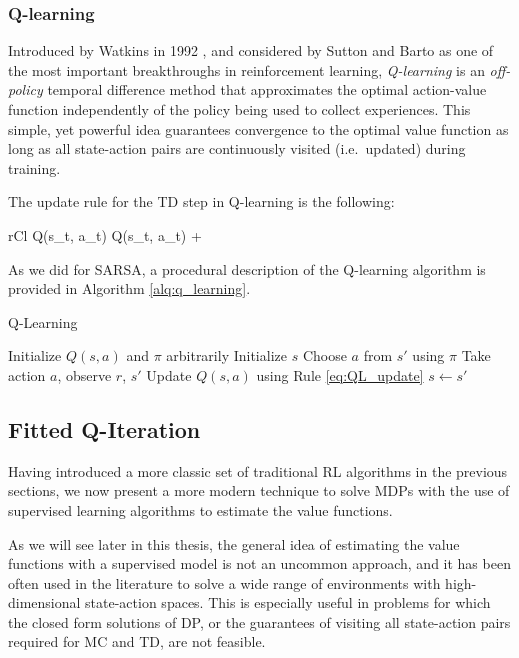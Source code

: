\subsubsection{Q-learning}
Introduced by Watkins in 1992 \cite{watkins1992q}, and considered by Sutton and 
Barto \cite{sutton1998reinforcement} as one of the most important breakthroughs 
in reinforcement learning, \textit{Q-learning} is an \textit{off-policy} 
temporal difference method that approximates the optimal action-value function 
independently of the policy being used to collect experiences. 
This simple, yet powerful idea guarantees convergence to the optimal 
value function as long as all state-action pairs are continuously visited (i.e.\ 
updated) during training.

The update rule for the TD step in Q-learning is the following: 
%
\begin{IEEEeqnarray}{rCl}
    Q(s_t, a_t) \leftarrow Q(s_t, a_t) +  \label{eq:QL_update}
\end{IEEEeqnarray}
%
As we did for SARSA, a procedural description of the Q-learning algorithm is
provided in Algorithm \ref{alq:q_learning}.
%
\begin{algorithm}
    \caption{Q-Learning}
    \label{alq:q_learning}
    \begin{algorithmic}
        \STATE Initialize $Q(s,a)$ and $\pi$ arbitrarily
        \REPEAT
	    \STATE Initialize $s$
	    \REPEAT	
		\STATE Choose $a$ from $s'$ using $\pi$
		\STATE Take action $a$, observe $r$, $s'$
		\STATE Update $Q(s, a)$ using Rule \eqref{eq:QL_update}
		\STATE $s \leftarrow s'$
    \end{algorithmic}
\end{algorithm}
%

\subsection{Fitted Q-Iteration} \label{s:FQI}
Having introduced a more classic set of traditional RL algorithms in the 
previous sections, we now present a more modern technique to solve MDPs with the 
use of supervised learning algorithms to estimate the value functions.

As we will see later in this thesis, the general idea of estimating the value 
functions with a supervised model is not an uncommon approach, and it has been 
often used in the literature to solve a wide range of environments with 
high-dimensional state-action spaces.
This is especially useful in problems for which the closed form solutions of DP,
or the guarantees of visiting all state-action pairs required for MC and TD, are 
not feasible.

